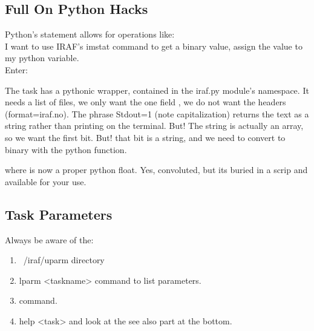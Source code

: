 \subsection{Full On Python Hacks}

\example Python's  statement allows for operations like: \\
\prose I want to use IRAF's imstat command to get a binary value, assign
the value to my python variable. \\
\exercise Enter: \\
{}

\takeaway The task has a pythonic wrapper, contained in the iraf.py
module's namespace.  It needs a list of files, we only want the one
field , we do not want the headers (format=iraf.no). The
phrase Stdout=1 (note capitalization) returns the text as a string
rather than printing on the terminal. But! The string is actually an
array, so we want the first bit. But! that bit is a string, and we
need to convert to binary with the  python function.

where  is now a proper python float. Yes, convoluted, but
its buried in a scrip and available for your use. 

\subsection{Task Parameters}

Always be aware of the:
\vspace{-.15cm}
\begin{enumerate}\addtolength{\itemsep}{-0.5\baselineskip}
   \item    ~/iraf/uparm directory
   \item    lparm <taskname> command to list parameters.
   \item    {} command.
   \item   help <task> and look at the see also part at the bottom.
\end{enumerate}

